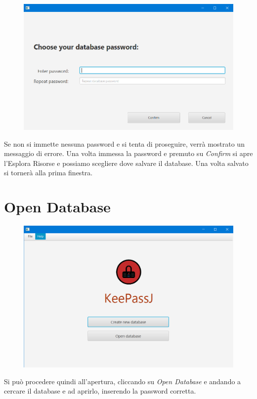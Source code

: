 \documentclass[a4paper,12pt]{report}
\begin{document}
\begin{figure}[h]
\centering{}
\includegraphics[width=\textwidth]{user-manual/5}
\end{figure}
Se non si immette nessuna password e si tenta di proseguire, verrà mostrato un messaggio di errore.
Una volta immessa la password e premuto su \textit{Confirm} si apre l’Esplora Risorse e possiamo scegliere dove salvare il database. Una volta salvato si tornerà alla prima finestra.

\clearpage


\section*{Open Database}
\begin{figure}[h]
\centering{}
\includegraphics[width=\textwidth]{user-manual/1}
\end{figure}

Si può procedere quindi all’apertura, cliccando su \textit{Open Database} e andando a cercare il database e ad aprirlo, inserendo la password corretta.
\end{document}
